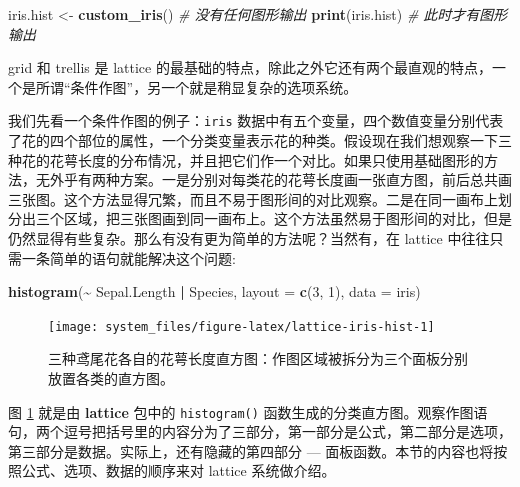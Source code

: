 \documentclass[
  b5paper,
  UTF8,twoside]{book}
\newenvironment{Shaded}{\begin{snugshade}}{\end{snugshade}}
\newcommand{\AttributeTok}[1]{\textcolor[rgb]{0.13,0.29,0.53}{#1}}
\newcommand{\CommentTok}[1]{\textcolor[rgb]{0.56,0.35,0.01}{\textit{#1}}}
\newcommand{\DecValTok}[1]{\textcolor[rgb]{0.00,0.00,0.81}{#1}}
\newcommand{\FunctionTok}[1]{\textcolor[rgb]{0.13,0.29,0.53}{\textbf{#1}}}
\newcommand{\NormalTok}[1]{#1}
\newcommand{\OtherTok}[1]{\textcolor[rgb]{0.56,0.35,0.01}{#1}}
\newcommand{\SpecialCharTok}[1]{\textcolor[rgb]{0.81,0.36,0.00}{\textbf{#1}}}
\begin{document}
\begin{Shaded}
\begin{Highlighting}[]
\NormalTok{iris.hist }\OtherTok{\textless{}{-}} \FunctionTok{custom\_iris}\NormalTok{() }\CommentTok{\# 没有任何图形输出}
\FunctionTok{print}\NormalTok{(iris.hist) }\CommentTok{\# 此时才有图形输出}
\end{Highlighting}
\end{Shaded}

grid 和 trellis 是 lattice 的最基础的特点，除此之外它还有两个最直观的特点，一个是所谓``条件作图''，另一个就是稍显复杂的选项系统。

我们先看一个条件作图的例子：\texttt{iris} 数据中有五个变量，四个数值变量分别代表了花的四个部位的属性，一个分类变量表示花的种类。假设现在我们想观察一下三种花的花萼长度的分布情况，并且把它们作一个对比。如果只使用基础图形的方法，无外乎有两种方案。一是分别对每类花的花萼长度画一张直方图，前后总共画三张图。这个方法显得冗繁，而且不易于图形间的对比观察。二是在同一画布上划分出三个区域，把三张图画到同一画布上。这个方法虽然易于图形间的对比，但是仍然显得有些复杂。那么有没有更为简单的方法呢？当然有，在 lattice 中往往只需一条简单的语句就能解决这个问题:

\begin{Shaded}
\begin{Highlighting}[]
\FunctionTok{histogram}\NormalTok{(}\SpecialCharTok{\textasciitilde{}}\NormalTok{ Sepal.Length }\SpecialCharTok{|}\NormalTok{ Species, }\AttributeTok{layout =} \FunctionTok{c}\NormalTok{(}\DecValTok{3}\NormalTok{, }\DecValTok{1}\NormalTok{), }\AttributeTok{data =}\NormalTok{ iris)}
\end{Highlighting}
\end{Shaded}

\begin{figure}

{\centering \texttt{[image: system\_files/figure-latex/lattice-iris-hist-1]} 

}

\caption[三种鸢尾花各自的花萼长度直方图]{三种鸢尾花各自的花萼长度直方图：作图区域被拆分为三个面板分别放置各类的直方图。}\label{fig:lattice-iris-hist}
\end{figure}



图 \ref{fig:lattice-iris-hist} 就是由 \textbf{lattice} 包中的 \texttt{histogram()} 函数生成的分类直方图。观察作图语句，两个逗号把括号里的内容分为了三部分，第一部分是公式，第二部分是选项，第三部分是数据。实际上，还有隐藏的第四部分 --- 面板函数。本节的内容也将按照公式、选项、数据的顺序来对 lattice 系统做介绍。
\end{document}

